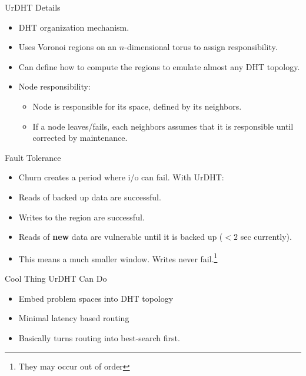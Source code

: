\documentclass[11pt]{beamer}
\begin{document}
\begin{frame}{UrDHT Details}
	\begin{itemize}
		\item DHT organization mechanism.
		\item Uses Voronoi regions on an $n$-dimensional torus to assign responsibility.
		\item Can define how to compute the regions to emulate almost any DHT topology.
		\item Node responsibility:
		\begin{itemize}
			\item Node is  responsible for its space, defined by its neighbors.
			\item If a node leaves/fails, each neighbors assumes that it is responsible until corrected by maintenance. 
		\end{itemize}
	\end{itemize}


\end{frame}

\begin{frame}{Fault Tolerance}
	\begin{itemize}
		\item Churn creates a period where i/o can fail.  With UrDHT:
		\item Reads of backed up data are successful.
		\item Writes to the region are successful. 
		\item Reads of \textbf{new} data are vulnerable until it is backed up ($<2$ sec currently).
		\item This means a much smaller window.  Writes never fail.\footnote{They may occur out of order}
	\end{itemize}

\end{frame}


\begin{frame}{Cool Thing UrDHT Can Do}
	\begin{itemize}
		\item Embed problem spaces into DHT topology
		\item Minimal latency based routing
		\item Basically turns routing into best-search first.
		
	\end{itemize}
\end{frame}
\end{document}
